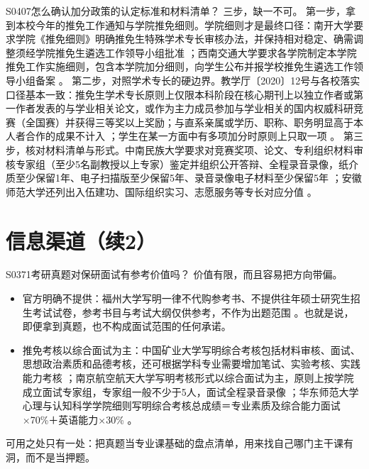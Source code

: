 \begin{qa}{S0407}{怎么确认加分政策的认定标准和材料清单？}
三步，缺一不可。
第一步，拿到本校今年的推免工作通知与学院推免细则。学院细则才是最终口径：南开大学要求学院《推免细则》明确推免生特殊学术专长审核办法，并保持相对稳定、确需调整须经学院推免生遴选工作领导小组批准 ；西南交通大学要求各学院制定本学院推免工作实施细则，包含本学院加分细则，向学生公布并报学校推免生遴选工作领导小组备案 。
第二步，对照学术专长的硬边界。教学厅〔2020〕12号与各校落实口径基本一致：推免生学术专长原则上仅限本科阶段在核心期刊上以独立作者或第一作者发表的与学业相关论文，或作为主力成员参加与学业相关的国内权威科研竞赛（全国赛）并获得三等奖以上奖励；与直系亲属或学历、职称、职务明显高于本人者合作的成果不计入 ；学生在某一方面中有多项加分时原则上只取一项 。
第三步，核对材料清单与形式。中南民族大学要求对竞赛奖项、论文、专利组织材料审核专家组（至少5名副教授以上专家）鉴定并组织公开答辩、全程录音录像，纸介质至少保留1年、电子扫描版至少保留5年、录音录像电子材料至少保留5年 ；安徽师范大学还列出入伍建功、国际组织实习、志愿服务等专长对应分值 。
\end{qa}

\section{信息渠道（续2）}
\begin{qa}{S0371}{考研真题对保研面试有参考价值吗？}
价值有限，而且容易把方向带偏。
\begin{itemize}
  \item 官方明确不提供：福州大学写明一律不代购参考书、不提供往年硕士研究生招生考试试卷，参考书目与考试大纲仅供参考，不作为出题范围 。也就是说，即便拿到真题，也不构成面试范围的任何承诺。
  \item 推免考核以综合面试为主：中国矿业大学写明综合考核包括材料审核、面试、思想政治素质和品德考核，还可根据学科专业需要增加笔试、实验考核、实践能力考核 ；南京航空航天大学写明考核形式以综合面试为主，原则上按学院成立面试专家组，专家组一般不少于5人，面试全程录音录像 ；华东师范大学心理与认知科学学院细则写明综合考核总成绩＝专业素质及综合能力面试×70\%＋英语能力×30\% 。
\end{itemize}
可用之处只有一处：把真题当专业课基础的盘点清单，用来找自己哪门主干课有洞，而不是当押题。
\end{qa}

